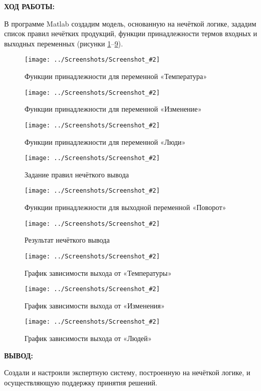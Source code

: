 \documentclass[14pt,a4paper]{extreport}
\newcommand{\sshot}[2]{\begin{figure}[ht]%
\centering\texttt{[image: ../Screenshots/Screenshot\_\#2]}%
\caption{#1}%
\label{sshot#2}%
\end{figure}%
}
\newcommand{\header}[1]{%
{
\clearpage%
\fontsize{16pt}{14pt}\selectfont
\begin{center}
\textbf{\MakeUppercase{#1}:}
\end{center}
}
}
\begin{document}
\header{Ход работы}

В программе Matlab создадим модель, основанную на нечёткой логике, зададим список правил нечётких продукций, функции принадлежности термов входных и выходных переменных (рисунки \ref{sshot1}--\ref{sshot9}).

\sshot{Функции принадлежности для переменной «Температура»}{1}
\sshot{Функции принадлежности для переменной «Изменение»}{2}
\sshot{Функции принадлежности для переменной «Люди»}{3}
\sshot{Задание правил нечёткого вывода}{4}
\sshot{Функции принадлежности для выходной переменной «Поворот»}{5}
\sshot{Результат нечёткого вывода}{6}
\sshot{График зависимости выхода от «Температуры»}{7}
\sshot{График зависимости выхода от «Изменения»}{8}
\sshot{График зависимости выхода от «Людей»}{9}

\header{Вывод}



Создали и настроили экспертную систему, построенную на нечёткой логике, и осуществляющую поддержку принятия решений.
\end{document}
